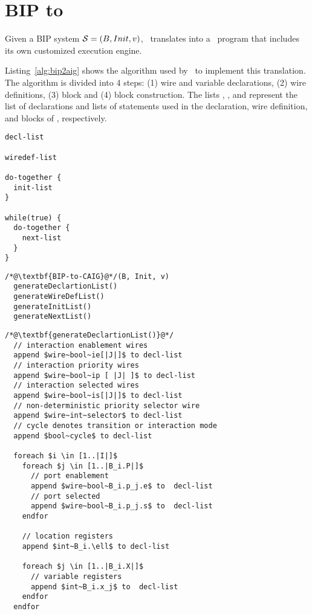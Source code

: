 
\section{BIP to \thislanguage}
\label{chap3:bip2aig:bip2etc}
Given a BIP system $\mathcal{S} = (B, Init, v)$, \biptool~translates \Pm into 
a \thislanguage~program \aigcircuit that includes its own customized execution engine. 

Listing~\ref{alg:bip2aig} shows the algorithm used by \biptool~to implement 
this translation. The algorithm is divided into 4 steps: (1) wire and variable
declarations, (2) wire definitions, (3)  block and (4)  block construction. 
The lists , ,  and 
represent the list of declarations and lists of statements used in the 
declaration, wire definition,  and  blocks of \aigcircuit, respectively. 



\begin{lstlisting}
decl-list

wiredef-list

do-together {
  init-list
}

while(true) {
  do-together {
    next-list
  }
}
\end{lstlisting}

\begin{lstlisting}
/*@\textbf{BIP-to-CAIG}@*/(B, Init, v)
  generateDeclartionList()
  generateWireDefList()
  generateInitList()
  generateNextList()
\end{lstlisting}

\begin{lstlisting}
/*@\textbf{generateDeclartionList()}@*/
  // interaction enablement wires
  append $wire~bool~ie[|J|]$ to decl-list
  // interaction priority wires
  append $wire~bool~ip [ |J| ]$ to decl-list 
  // interaction selected wires
  append $wire~bool~is[|J|]$ to decl-list 
  // non-deterministic priority selector wire
  append $wire~int~selector$ to decl-list 
  // cycle denotes transition or interaction mode
  append $bool~cycle$ to decl-list  

  foreach $i \in [1..|I|]$
    foreach $j \in [1..|B_i.P|]$ 
      // port enablement
      append $wire~bool~B_i.p_j.e$ to  decl-list 
      // port selected
      append $wire~bool~B_i.p_j.s$ to  decl-list 
    endfor

    // location registers
    append $int~B_i.\ell$ to decl-list
    
    foreach $j \in [1..|B_i.X|]$ 
      // variable registers
      append $int~B_i.x_j$ to  decl-list 
    endfor
  endfor
\end{lstlisting}


